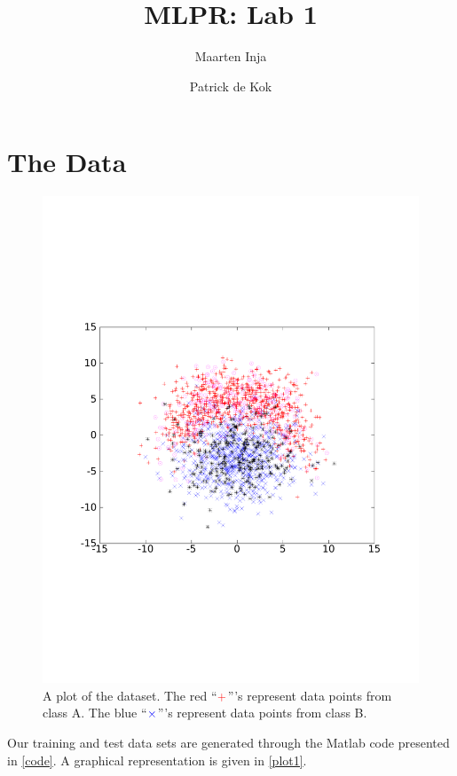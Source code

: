 \documentclass[a4paper,11pt]{article}
\author{Maarten Inja \and Patrick de Kok}
\title{MLPR: Lab 1}
\begin{document}
\maketitle

\section{The Data}
\begin{figure}[h]
  \begin{center}
  \caption{A plot of the dataset.  The red ``$\color{red}+$'''s represent data points from class A. The blue ``$\color{blue}\times$'''s represent data points from class B.}
  \label{plot1}
    \includegraphics[width=0.6\paperwidth]{plot1}
  \end{center}
\end{figure}

Our training and test data sets are generated through the Matlab code presented in \autoref{code}.  A graphical representation is given in \autoref{plot1}.
\end{document}
